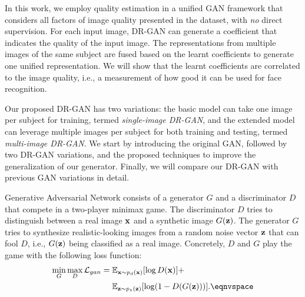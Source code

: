 \documentclass[10pt,journal,compsoc]{IEEEtran}
\begin{document}
In this work, we employ quality estimation in a unified GAN framework that considers all factors of image quality presented in the dataset, with {\it no} direct supervision.
For each input image, DR-GAN can generate a coefficient that indicates the quality of the input image. 
The representations from multiple images of the same subject are fused based on the learnt coefficients to generate one unified representation. 
We will show that the learnt coefficients are correlated to the image quality, i.e., a measurement of how good it can be used for face recognition. 


Our proposed DR-GAN has two variations: the basic model can take one image per subject for training, termed {\it single-image DR-GAN}, and the extended model can leverage multiple images per subject for both training and testing, termed {\it multi-image DR-GAN}. 
We start by introducing the original GAN, followed by two DR-GAN variations, and the proposed techniques to improve the generalization of our generator. 
Finally, we will compare our DR-GAN with previous GAN variations in detail. 

Generative Adversarial Network consists of a generator $G$ and a discriminator $D$ that compete in a two-player minimax game.
The discriminator $D$ tries to distinguish between a real image $\bf{x}$ and a synthetic image $G(\bf{z})$.
The generator $G$ tries to synthesize realistic-looking images from a random noise vector $\bf{z}$ that can fool $D$, i.e., $G(\bf{z})$ being classified as a real image. 
Concretely, $D$ and $G$ play the game with the following loss function:
\eqnvspace\begin{align}
\min_{G} \max_{D} \mathcal{L}_{gan} = {} & \mathbb{E}_{\mathbf{x} \sim p_{d}(\mathbf{x})} [\log D(\mathbf{x})] + \nonumber \\ 
& \mathbb{E}_{\mathbf{z} \sim p_{z}(\mathbf{z})} [\log(1- D(G(\mathbf{z}))) ].
\eqnvspace
\end{align}
\end{document}
